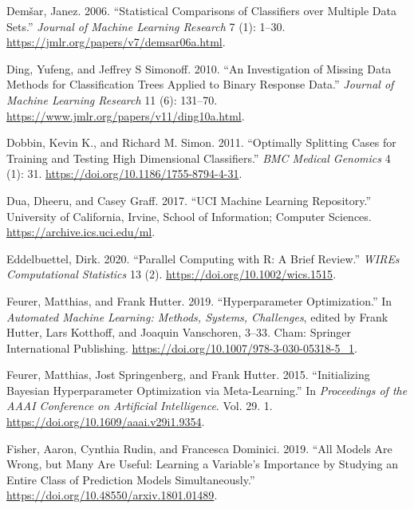 \begin{CSLReferences}{1}{0}
\leavevmode{}%
Demšar, Janez. 2006. {``Statistical Comparisons of Classifiers over
Multiple Data Sets.''} \emph{Journal of Machine Learning Research} 7
(1): 1--30. \url{https://jmlr.org/papers/v7/demsar06a.html}.

\leavevmode{}%
Ding, Yufeng, and Jeffrey S Simonoff. 2010. {``An Investigation of
Missing Data Methods for Classification Trees Applied to Binary Response
Data.''} \emph{Journal of Machine Learning Research} 11 (6): 131--70.
\url{https://www.jmlr.org/papers/v11/ding10a.html}.

\leavevmode{}%
Dobbin, Kevin K., and Richard M. Simon. 2011. {``Optimally Splitting
Cases for Training and Testing High Dimensional Classifiers.''}
\emph{BMC Medical Genomics} 4 (1): 31.
\url{https://doi.org/10.1186/1755-8794-4-31}.

\leavevmode{}%
Dua, Dheeru, and Casey Graff. 2017. {``{UCI} Machine Learning
Repository.''} University of California, Irvine, School of Information;
Computer Sciences. \url{https://archive.ics.uci.edu/ml}.

\leavevmode{}%
Eddelbuettel, Dirk. 2020. {``Parallel Computing with {R}: A Brief
Review.''} \emph{{WIREs} Computational Statistics} 13 (2).
\url{https://doi.org/10.1002/wics.1515}.

\leavevmode{}%
Feurer, Matthias, and Frank Hutter. 2019. {``Hyperparameter
Optimization.''} In \emph{Automated Machine Learning: Methods, Systems,
Challenges}, edited by Frank Hutter, Lars Kotthoff, and Joaquin
Vanschoren, 3--33. Cham: Springer International Publishing.
\url{https://doi.org/10.1007/978-3-030-05318-5_1}.

\leavevmode{}%
Feurer, Matthias, Jost Springenberg, and Frank Hutter. 2015.
{``Initializing {B}ayesian Hyperparameter Optimization via
Meta-Learning.''} In \emph{Proceedings of the AAAI Conference on
Artificial Intelligence}. Vol. 29. 1.
\url{https://doi.org/10.1609/aaai.v29i1.9354}.

\leavevmode{}%
Fisher, Aaron, Cynthia Rudin, and Francesca Dominici. 2019. {``All
Models Are Wrong, but Many Are Useful: Learning a Variable's Importance
by Studying an Entire Class of Prediction Models Simultaneously.''}
\url{https://doi.org/10.48550/arxiv.1801.01489}.


\end{CSLReferences}
